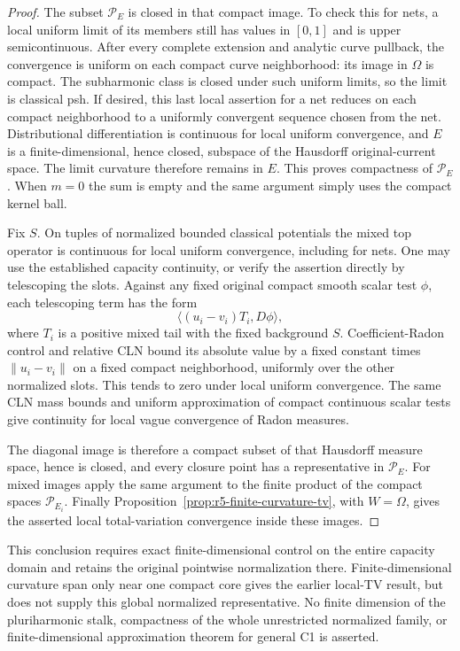 \documentclass[11pt,a4paper]{article}
\numberwithin{equation}{section}
\theoremstyle{definition}
\theoremstyle{remark}
\begin{document}
\begin{proof}
The subset $\mathcal P_E$ is closed in that compact image.
To check this for nets, a local uniform limit of its members
still has values in $[0,1]$ and is upper semicontinuous.
After every complete extension and analytic curve pullback,
the convergence is uniform on each compact curve neighborhood:
its image in $\Omega$ is compact.  The subharmonic class is
closed under such uniform limits, so the limit is classical
psh.  If desired, this last local assertion for a net reduces
on each compact neighborhood to a uniformly convergent
sequence chosen from the net.  Distributional
differentiation is continuous for local uniform convergence,
and $E$ is a finite-dimensional, hence closed, subspace of
the Hausdorff original-current space.  The limit curvature
therefore remains in $E$.  This proves compactness of
$\mathcal P_E$.  When $m=0$ the sum is empty and the same
argument simply uses the compact kernel ball.

Fix $S$.  On tuples of normalized bounded classical
potentials the mixed top operator is continuous for local
uniform convergence, including for nets.  One may use the
established capacity continuity, or verify the assertion
directly by telescoping the slots.  Against any fixed
original compact smooth scalar test $\phi$, each telescoping
term has the form
\[
              \langle (u_i-v_i)T_i,D\phi\rangle,
\]
where $T_i$ is a positive mixed tail with the fixed background
$S$.  Coefficient-Radon control and relative CLN bound its
absolute value by a fixed constant times
$\|u_i-v_i\|$ on a fixed compact neighborhood, uniformly
over the other normalized slots.  This tends to zero under
local uniform convergence.  The same CLN mass bounds and
uniform approximation of compact continuous scalar tests
give continuity for local vague convergence of Radon measures.

The diagonal image is therefore a compact subset of that
Hausdorff measure space, hence is closed, and every closure
point has a representative in $\mathcal P_E$.
For mixed images apply the same argument to the finite
product of the compact spaces $\mathcal P_{E_i}$.
Finally Proposition~\ref{prop:r5-finite-curvature-tv}, with
$W=\Omega$, gives the asserted local total-variation
convergence inside these images.
\end{proof}

This conclusion requires exact finite-dimensional control on
the entire capacity domain and retains the original pointwise
normalization there.  Finite-dimensional curvature span only
near one compact core gives the earlier local-TV result, but
does not supply this global normalized representative.
No finite dimension of the pluriharmonic stalk, compactness
of the whole unrestricted normalized family, or
finite-dimensional approximation theorem for general C1 is
asserted.
\end{document}
